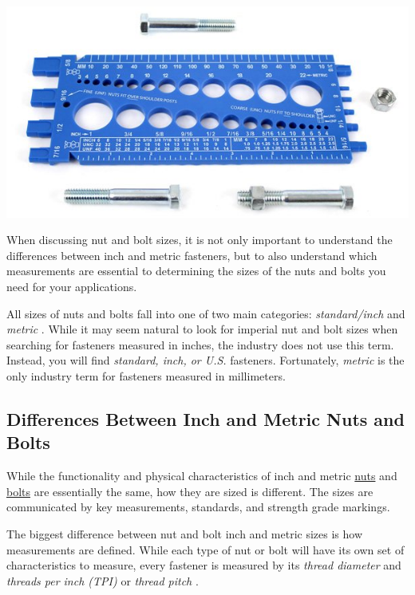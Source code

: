 \documentclass[12pt, a4paper]{article}
\begin{document}
		\hypertarget{idgbn}{}
		\hypertarget{iz9k}{}
		\includegraphics{Introduction to Nut and Bolt Sizes_files/62ffc530cd49d888286820.jpg}
		
		\hypertarget{ikxe}{}
		When discussing nut and bolt sizes, it is not only important to
		understand the differences between inch and metric fasteners, but to
		also understand which measurements are essential to determining the
		sizes of the nuts and bolts you need for your applications.
		
		\hypertarget{iov0gj}{}
		All sizes of nuts and bolts fall into one of two main categories:
		\emph{standard/inch} and \emph{metric} . While it may seem natural to
		look for imperial nut and bolt sizes when searching for fasteners
		measured in inches, the industry does not use this term. Instead, you
		will find \emph{standard, inch, or U.S.} fasteners. Fortunately,
		\emph{metric} is the only industry term for fasteners measured in
		millimeters.
		
		\hypertarget{ivhqvk}{%
			\subsection{Differences Between Inch and Metric Nuts and
				Bolts}\label{ivhqvk}}
		
		\hypertarget{igonwo}{}
		While the functionality and physical characteristics of inch and metric
		\href{https://www.huyett.com/all-products/nuts}{nuts} and
		\href{https://www.huyett.com/all-products/bolts}{bolts} are essentially
		the same, how they are sized is different. The sizes are communicated by
		key measurements, standards, and strength grade markings.
		
		\hypertarget{im7ycf}{}
		The biggest difference between nut and bolt inch and metric sizes is how
		measurements are defined. While each type of nut or bolt will have its
		own set of characteristics to measure, every fastener is measured by its
		\emph{thread diameter} and \emph{threads per inch (TPI)} or \emph{thread
			pitch} .
		
\end{document}
